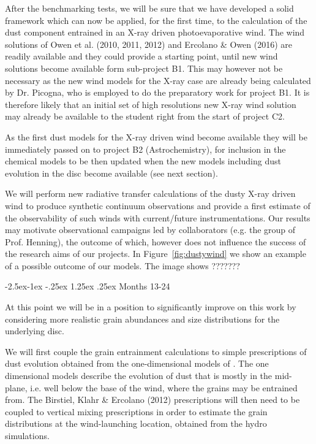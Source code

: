 \documentclass[10pt,fleqn,twoside]{article}
\makeatletter
\renewcommand\paragraph{\@startsection{paragraph}{4}{\z@}%
            {-2.5ex\@plus -1ex \@minus -.25ex}%
            {1.25ex \@plus .25ex}%
            {\normalfont\normalsize\bfseries}}
\makeatother
\begin{document}
After the benchmarking tests, we will be sure that we have developed a
solid framework which can now be applied, for the
first time, to the calculation of the dust component entrained in an
X-ray driven photoevaporative wind. The wind solutions of Owen et
al. (2010, 2011, 2012) and Ercolano \& Owen (2016) are readily
available and they could provide a starting point, until new 
wind solutions become available form sub-project B1. This may however
not be necessary as the new wind models for the X-ray case
are already being calculated by Dr. Picogna, who is employed to do the
preparatory work for project B1. It is therefore likely that an
initial set of high resolutions new X-ray wind solution may already be
available to the student right from the start of project C2.
 
As the first dust models for the X-ray driven wind become available
they will be immediately passed on to project B2 (Astrochemistry), for
inclusion in the chemical models to be then updated when the new
models including dust evolution in the disc become available (see next
section). 

We will perform new radiative transfer calculations of the dusty
X-ray driven wind to produce synthetic continuum observations and
provide a first estimate of the observability of such winds with
current/future instrumentations. Our results may motivate
observational campaigns led by collaborators (e.g. the group of
Prof. Henning), the outcome of which, however does not influence the
success of the research aims of our projects. In
Figure~\ref{fig:dustywind} we show an example of a possible outcome of
our models. The image shows ??????? 

\paragraph{Months 13-24}
 
At this point we will be in a position to significantly improve on
this work by considering more realistic grain abundances and size
distributions for the underlying disc. 

We will first couple the grain entrainment calculations to simple
prescriptions of dust  evolution \citep[e.g.,][]{2012A&A...539A.148B}
obtained from the one-dimensional models of
\citet{2010A&A...513A..79B}. The one dimensional models describe the
evolution of dust that is mostly in the mid-plane, i.e. well below the
base of the wind, where the grains may be entrained from. The
Birstiel, Klahr \& Ercolano (2012) prescriptions will then need to be
coupled to vertical mixing prescriptions \citep{2009A&A...496..597F} in order to
estimate the grain distributions at the wind-launching location,
obtained from the hydro simulations. 
\end{document}

